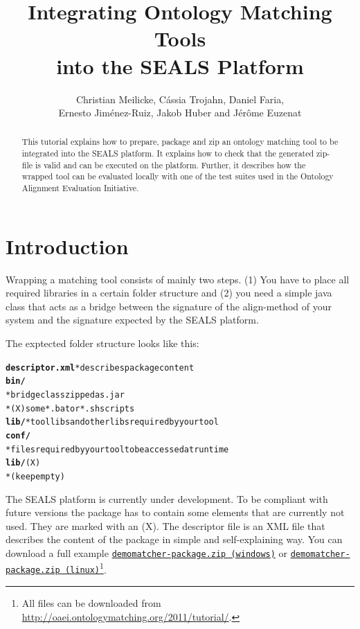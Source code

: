 \documentclass{article}
\begin{document}
\title{Integrating Ontology Matching Tools \\ into the SEALS Platform}

\author{Christian Meilicke, C\'assia Trojahn, Daniel Faria, \\ Ernesto Jim\'{e}nez-Ruiz, Jakob Huber and J\'er\^ome Euzenat}

\maketitle

\begin{abstract}
This tutorial explains how to prepare, package and zip an ontology matching tool to be integrated into the SEALS platform. It explains 
how to check that the generated zip-file is valid and can be executed on the platform. Further, it describes how the wrapped tool can 
be evaluated locally with one of the test suites used in the Ontology Alignment Evaluation Initiative. 
\end{abstract}


\section{Introduction}
\label{sec:intro}

Wrapping a matching tool consists of mainly two steps. (1) You have to place all required libraries in a certain folder structure and (2) you need a simple java class that acts as a bridge between the signature of the align-method of your system and the signature expected by the SEALS platform.

The exptected folder structure looks like this:

\begin{alltt}
\textbf{descriptor.xml}  * describes package content 
\textbf{bin/}   
   * bridge class zipped as .jar
   * (X) some *.bat or *.sh scripts
   \textbf{lib/}  * tool libs and other libs required by your tool  
\textbf{conf/}
   * files required by your tool to be accessed at runtime
\textbf{lib/} (X)
   * (keep empty)
\end{alltt}

The SEALS platform is currently under development. To be compliant with future versions the package has to contain some elements that are currently not used. They are marked with an (X). The descriptor file is an XML file that describes the content of the package in simple and self-explaining way. You can download a full example \href{http://oaei.ontologymatching.org/2011/tutorial/windows/demomatcher-package.zip}{\nolinkurl{demomatcher-package.zip (windows)}} or \href{http://oaei.ontologymatching.org/2011/tutorial/linux/demomatcher-package.zip}{\nolinkurl{demomatcher-package.zip (linux)}}\footnote{All files can be downloaded from \url{http://oaei.ontologymatching.org/2011/tutorial/}.}.
\end{document}
